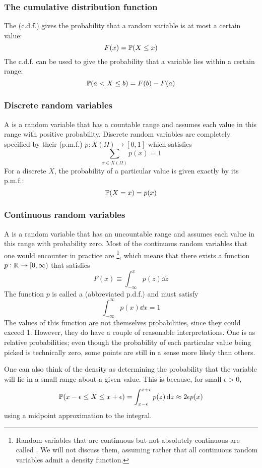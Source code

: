 \subsubsection{The cumulative distribution function}
The  (c.d.f.) gives the probability that a random variable is at most a certain value:
\[F(x) = \mathbb{P}(X \leq x)\]
The c.d.f. can be used to give the probability that a variable lies within a certain range:
\[\mathbb{P}(a < X \leq b) = F(b) - F(a)\]

\subsubsection{Discrete random variables}
A  is a random variable that has a countable range and assumes each value in this range with positive probability.
Discrete random variables are completely specified by their  (p.m.f.) $p : X(\Omega) \to [0,1]$ which satisfies
\[\sum_{x \in X(\Omega)} p(x) = 1\]
For a discrete $X$, the probability of a particular value is given exactly by its p.m.f.:
\[\mathbb{P}(X = x) = p(x)\]

\subsubsection{Continuous random variables}
A  is a random variable that has an uncountable range and assumes each value in this range with probability zero.
Most of the continuous random variables that one would encounter in practice are \footnote{
    Random variables that are continuous but not absolutely continuous are called .
    We will not discuss them, assuming rather that all continuous random variables admit a density function.
}, which means that there exists a function $p : \mathbb{R} \to [0,\infty)$ that satisfies
\[F(x) \equiv \int_{-\infty}^x p(z)\dd{z}\]
The function $p$ is called a  (abbreviated p.d.f.) and must satisfy
\[\int_{-\infty}^\infty p(x)\dd{x} = 1\]
The values of this function are not themselves probabilities, since they could exceed 1.
However, they do have a couple of reasonable interpretations.
One is as relative probabilities; even though the probability of each particular value being picked is technically zero, some points are still in a sense more likely than others.

One can also think of the density as determining the probability that the variable will lie in a small range about a given value.
This is because, for small $\epsilon > 0$,
\[\mathbb{P}(x-\epsilon \leq X \leq x+\epsilon) = \int_{x-\epsilon}^{x+\epsilon} p(z)\dd{z} \approx 2\epsilon p(x)\]
using a midpoint approximation to the integral.

